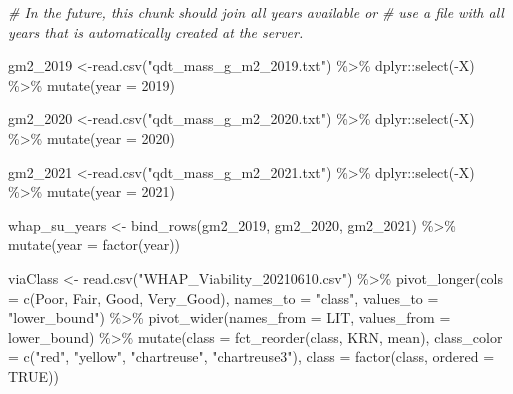 \documentclass[
]{article}
\newenvironment{Shaded}{\begin{snugshade}}{\end{snugshade}}
\newcommand{\AttributeTok}[1]{\textcolor[rgb]{0.77,0.63,0.00}{#1}}
\newcommand{\CommentTok}[1]{\textcolor[rgb]{0.56,0.35,0.01}{\textit{#1}}}
\newcommand{\ConstantTok}[1]{\textcolor[rgb]{0.00,0.00,0.00}{#1}}
\newcommand{\DecValTok}[1]{\textcolor[rgb]{0.00,0.00,0.81}{#1}}
\newcommand{\FunctionTok}[1]{\textcolor[rgb]{0.00,0.00,0.00}{#1}}
\newcommand{\NormalTok}[1]{#1}
\newcommand{\OtherTok}[1]{\textcolor[rgb]{0.56,0.35,0.01}{#1}}
\newcommand{\SpecialCharTok}[1]{\textcolor[rgb]{0.00,0.00,0.00}{#1}}
\newcommand{\StringTok}[1]{\textcolor[rgb]{0.31,0.60,0.02}{#1}}
\begin{document}
\begin{Shaded}
\begin{Highlighting}[]
\CommentTok{\# In the future, this chunk should join all years available or}
\CommentTok{\# use a file with all years that is automatically created at the server.}

\NormalTok{gm2\_2019 }\OtherTok{\textless{}{-}}\FunctionTok{read.csv}\NormalTok{(}\StringTok{"qdt\_mass\_g\_m2\_2019.txt"}\NormalTok{) }\SpecialCharTok{\%\textgreater{}\%}
\NormalTok{  dplyr}\SpecialCharTok{::}\FunctionTok{select}\NormalTok{(}\SpecialCharTok{{-}}\NormalTok{X) }\SpecialCharTok{\%\textgreater{}\%}
  \FunctionTok{mutate}\NormalTok{(}\AttributeTok{year =} \DecValTok{2019}\NormalTok{)}

\NormalTok{gm2\_2020 }\OtherTok{\textless{}{-}}\FunctionTok{read.csv}\NormalTok{(}\StringTok{"qdt\_mass\_g\_m2\_2020.txt"}\NormalTok{) }\SpecialCharTok{\%\textgreater{}\%}
\NormalTok{  dplyr}\SpecialCharTok{::}\FunctionTok{select}\NormalTok{(}\SpecialCharTok{{-}}\NormalTok{X) }\SpecialCharTok{\%\textgreater{}\%}
  \FunctionTok{mutate}\NormalTok{(}\AttributeTok{year =} \DecValTok{2020}\NormalTok{)}

\NormalTok{gm2\_2021 }\OtherTok{\textless{}{-}}\FunctionTok{read.csv}\NormalTok{(}\StringTok{"qdt\_mass\_g\_m2\_2021.txt"}\NormalTok{) }\SpecialCharTok{\%\textgreater{}\%}
\NormalTok{  dplyr}\SpecialCharTok{::}\FunctionTok{select}\NormalTok{(}\SpecialCharTok{{-}}\NormalTok{X) }\SpecialCharTok{\%\textgreater{}\%}
  \FunctionTok{mutate}\NormalTok{(}\AttributeTok{year =} \DecValTok{2021}\NormalTok{)}

\NormalTok{whap\_su\_years }\OtherTok{\textless{}{-}} \FunctionTok{bind\_rows}\NormalTok{(gm2\_2019, gm2\_2020, gm2\_2021) }\SpecialCharTok{\%\textgreater{}\%}
  \FunctionTok{mutate}\NormalTok{(}\AttributeTok{year =} \FunctionTok{factor}\NormalTok{(year))}

\NormalTok{viaClass }\OtherTok{\textless{}{-}} \FunctionTok{read.csv}\NormalTok{(}\StringTok{"WHAP\_Viability\_20210610.csv"}\NormalTok{) }\SpecialCharTok{\%\textgreater{}\%}
  \FunctionTok{pivot\_longer}\NormalTok{(}\AttributeTok{cols =} \FunctionTok{c}\NormalTok{(Poor, Fair, Good, Very\_Good),}
               \AttributeTok{names\_to =} \StringTok{"class"}\NormalTok{,}
               \AttributeTok{values\_to =} \StringTok{"lower\_bound"}\NormalTok{) }\SpecialCharTok{\%\textgreater{}\%}
  \FunctionTok{pivot\_wider}\NormalTok{(}\AttributeTok{names\_from =}\NormalTok{ LIT,}
              \AttributeTok{values\_from =}\NormalTok{ lower\_bound) }\SpecialCharTok{\%\textgreater{}\%}
  \FunctionTok{mutate}\NormalTok{(}\AttributeTok{class =} \FunctionTok{fct\_reorder}\NormalTok{(class, KRN, mean),}
         \AttributeTok{class\_color =} \FunctionTok{c}\NormalTok{(}\StringTok{"red"}\NormalTok{, }\StringTok{"yellow"}\NormalTok{, }\StringTok{"chartreuse"}\NormalTok{, }\StringTok{"chartreuse3"}\NormalTok{),}
         \AttributeTok{class =} \FunctionTok{factor}\NormalTok{(class, }\AttributeTok{ordered =} \ConstantTok{TRUE}\NormalTok{))}
\end{Highlighting}
\end{Shaded}
\end{document}
